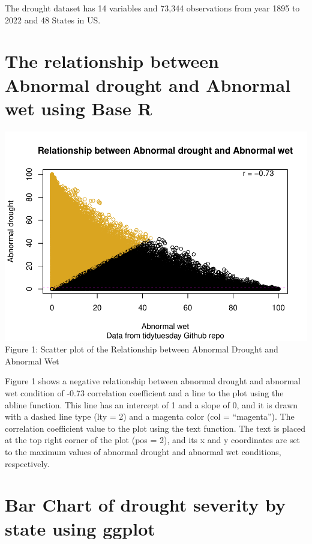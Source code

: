 \documentclass[
]{article}
\begin{document}
The drought dataset has 14 variables and 73,344 observations from year
1895 to 2022 and 48 States in US.

\newpage

\hypertarget{the-relationship-between-abnormal-drought-and-abnormal-wet-using-base-r}{%
\section{The relationship between Abnormal drought and Abnormal wet
using Base
R}\label{the-relationship-between-abnormal-drought-and-abnormal-wet-using-base-r}}

\includegraphics{C7083-213221-Markdown_files/figure-latex/Scatter plot of Abnormal drought and Abnormal wet-1.pdf}
Figure 1: Scatter plot of the Relationship between Abnormal Drought and
Abnormal Wet

Figure 1 shows a negative relationship between abnormal drought and
abnormal wet condition of -0.73 correlation coefficient and a line to
the plot using the abline function. This line has an intercept of 1 and
a slope of 0, and it is drawn with a dashed line type (lty = 2) and a
magenta color (col = ``magenta''). The correlation coefficient value to
the plot using the text function. The text is placed at the top right
corner of the plot (pos = 2), and its x and y coordinates are set to the
maximum values of abnormal drought and abnormal wet conditions,
respectively.

\hypertarget{bar-chart-of-drought-severity-by-state-using-ggplot}{%
\section{Bar Chart of drought severity by state using
ggplot}\label{bar-chart-of-drought-severity-by-state-using-ggplot}}
\end{document}
